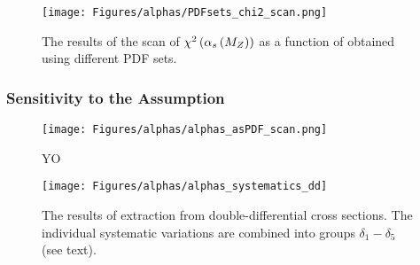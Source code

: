 \begin{figure}[t]
 \centering
 \texttt{[image: Figures/alphas/PDFsets\_chi2\_scan.png]}
 \caption{The results of the scan of $\chi^2\left(\mbox{$\alpha_{s}\left(M_{Z}\right)$}\right)$ as a function of \asz obtained using different PDF sets.}
 \label{fig:chi2scanpdf}
\end{figure}

\subsubsection{Sensitivity to the \asz Assumption}
\label{subsec:asassump}

\begin{figure}[t]
 \centering
 \texttt{[image: Figures/alphas/alphas\_asPDF\_scan.png]}
 \caption{YO}
 \label{fig:aschi2scanpdf}
\end{figure}

\begin{landscape}
\begin{figure}[p]
 \centering
 \caption{The results of \asz extraction from double-differential cross sections. The individual systematic variations are combined into groups $\delta_1-\delta_5$ (see text).}
 \label{fig:asthunc_dd}
 \texttt{[image: Figures/alphas/alphas\_systematics\_dd]}
\end{figure}
\end{landscape}